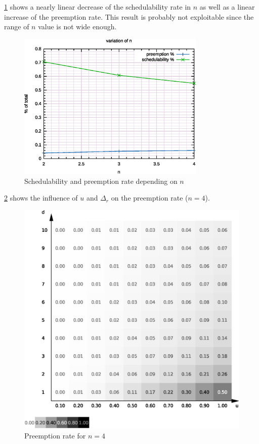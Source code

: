 \ref{fig:stu:an} shows a nearly linear decrease of the schedulability rate in $n$ as well as a linear increase of the preemption rate. This result is probably not exploitable since the range of $n$ value is not wide enough.

\begin{figure}
	\centering
	\includegraphics[width=0.8\textwidth]{../gnuplot/eps/3}
	\caption{\label{fig:stu:an} Schedulability and preemption rate depending on $n$}
\end{figure}

\ref{fig:stu:4p} shows the influence of $u$ and $\Delta_r$ on the preemption rate ($n = 4$).

\begin{figure}
	\centering
	\includegraphics[width=1\textwidth]{../mean/eps/4p}
	\caption{\label{fig:stu:4p} Preemption rate for $n = 4$}
\end{figure}

